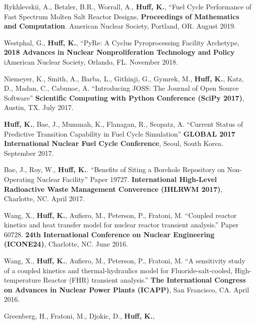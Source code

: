 \documentclass[margin,line]{resume}
\begin{document}
\begin{resume}
\begin{bibenum}
    \item Rykhlevskii, A., Betzler, B.R., Worrall, A., \textbf{Huff, K.}, 
            ``Fuel Cycle Performance of Fast Spectrum Molten Salt Reactor 
            Designs, \textbf{Proceedings of Mathematics and Computation}. 
            American Nuclear Society, Portland, OR. August 2019.
    \item Westphal, G., \textbf{Huff, K.}, ``PyRe: A Cyclus 
            Pyroprocessing Facility Archetype, \textbf{2018 
            Advances in Nuclear Nonproliferation Technology and Policy} 
            iAmerican Nuclear Society, Orlando, FL. November 2018.
    \item Niemeyer, K., Smith, A., Barba, L., Githinji, G., Gymrek, M.,
            \textbf{Huff, K.}, Katz, D., Madan, C., Cabunoc, A. ``Introducing
            JOSS: The Journal of Open Source Software'' \textbf{Scientific
            Computing with Python Conference (SciPy 2017)}, Austin, TX. July
            2017.
    \item \textbf{Huff, K.}, Bae, J., Mummah, K., Flanagan, R., Scopatz, A.
            ``Current Status of Predictive Transition Capability in Fuel Cycle
            Simulation'' \textbf{GLOBAL 2017 International Nuclear Fuel Cycle
            Conference}, Seoul, South Korea. September 2017.
      \item Bae, J., Roy, W., \textbf{Huff, K.}.
            ``Benefits of Siting a Borehole Repository on Non-Operating Nuclear
            Facility'' Paper 19727.  \textbf{International High-Level Radioactive
            Waste Management Converence (IHLRWM 2017)},
            Charlotte, NC. April 2017.
      \item Wang, X., \textbf{Huff, K.}, Aufiero, M., Peterson, P., Fratoni, M.
            ``Coupled reactor kinetics and heat transfer model for nuclear
            reactor transient analysis.'' Paper 60728.  \textbf{24th
            International Conference on Nuclear Engineering (ICONE24)},
            Charlotte, NC.  June 2016.
      \item Wang, X., \textbf{Huff, K.}, Aufiero, M., Peterson, P., Fratoni, M.
            ``A sensitivity study of a coupled kinetics and thermal-hydraulics
            model for Fluoride-salt-cooled, High-temperature Reactor (FHR)
            transient analysis.'' \textbf{The International
            Congress on Advances in Nuclear Power Plants (ICAPP)}, San
            Francisco, CA. April 2016.
      \item Greenberg, H., Fratoni, M., Djokic, D., \textbf{Huff, K.},

\end{bibenum}
\end{resume}
\end{document}
